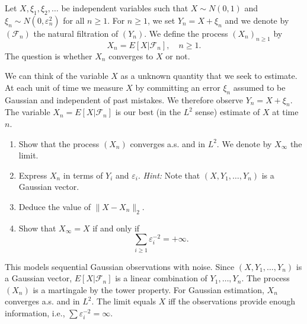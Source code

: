 \begin{exercise}
Let \(X, \xi_1, \xi_2, \ldots\) be independent variables such that \(X \sim N(0, 1)\) and \(\xi_n \sim N(0, \varepsilon_n^2)\) for all \(n \geq 1\). For \(n \geq 1\), we set \(Y_n = X + \xi_n\) and we denote by \((\mathcal{F}_n)\) the natural filtration of \((Y_n)\). We define the process \((X_n)_{n \geq 1}\) by
\[X_n = E[X | \mathcal{F}_n], \quad n \geq 1.\]
The question is whether \(X_n\) converges to \(X\) or not.

We can think of the variable \(X\) as a unknown quantity that we seek to estimate. At each unit of time we measure \(X\) by committing an error \(\xi_n\) assumed to be Gaussian and independent of past mistakes. We therefore observe \(Y_n = X + \xi_n\). The variable \(X_n = E[X | \mathcal{F}_n]\) is our best (in the \(L^2\) sense) estimate of \(X\) at time \(n\).
\begin{enumerate}
    \item Show that the process \((X_n)\) converges a.s. and in \(L^2\). We denote by \(X_\infty\) the limit.

    \item Express \(X_n\) in terms of \(Y_i\) and \(\varepsilon_i\).
    \textit{Hint:} Note that \((X, Y_1, \ldots, Y_n)\) is a Gaussian vector.

    \item Deduce the value of \(\|X - X_n\|_2\).

    \item Show that \(X_\infty = X\) if and only if
    \[\sum_{i \geq 1} \varepsilon_i^{-2} = +\infty.\]
\end{enumerate}

\begin{reminder}
This models sequential Gaussian observations with noise. Since \((X, Y_1, \ldots, Y_n)\) is a Gaussian vector, \(E[X|\mathcal{F}_n]\) is a linear combination of \(Y_1, \ldots, Y_n\). The process \((X_n)\) is a martingale by the tower property. For Gaussian estimation, \(X_n\) converges a.s. and in \(L^2\). The limit equals \(X\) iff the observations provide enough information, i.e., \(\sum \varepsilon_i^{-2} = \infty\).
\end{reminder}
\end{exercise}

